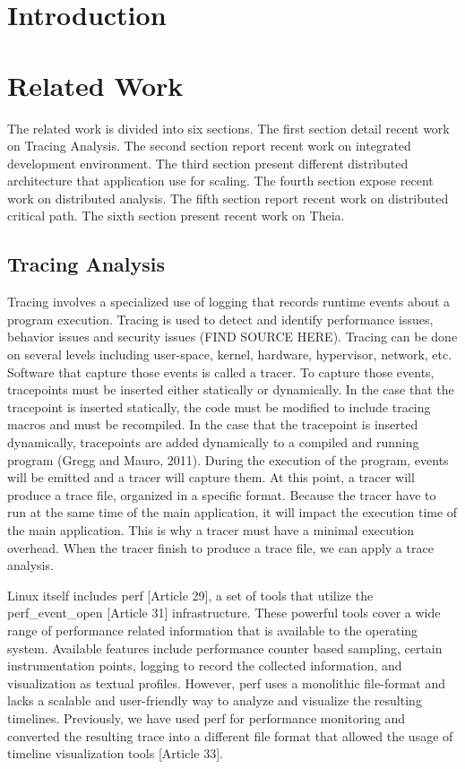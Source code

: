 \label{sec:architecture}

\section{Introduction}

\section{Related Work}

The related work is divided into six sections. The first section detail recent work on Tracing Analysis. The second section report recent work on integrated development environment. The third section present different distributed architecture that application use for scaling. The fourth section expose recent work on distributed analysis. The fifth section report recent work on distributed critical path. The sixth section present recent work on Theia.

\subsection{Tracing Analysis}

 Tracing involves a specialized use of logging that records runtime events about a program execution. Tracing is used to detect and identify performance issues, behavior issues and security issues (FIND SOURCE HERE). Tracing can be done on several levels including user-space, kernel, hardware, hypervisor, network, etc. Software that capture those events is called a tracer. To capture those events, tracepoints must be inserted either statically or dynamically. In the case that the tracepoint is inserted statically, the code must be modified to include tracing macros and must be recompiled. In the case that the tracepoint is inserted dynamically, tracepoints are added dynamically to a compiled and running program (Gregg and Mauro, 2011). During the execution of the program, events will be emitted and a tracer will capture them. At this point, a tracer will produce a trace file, organized in a specific format. Because the tracer have to run at the same time of the main application, it will impact the execution time of the main application. This is why a tracer must have a minimal execution overhead. When the tracer finish to produce a trace file, we can apply a trace analysis. 

Linux itself includes perf [Article 29], a set of tools that utilize the perf\_event\_open [Article 31] infrastructure. These powerful tools cover a wide range of performance related information that is available to the operating system. Available features include performance counter based sampling, certain instrumentation points, logging to record the collected information, and visualization as textual profiles. However, perf uses a monolithic file-format and lacks a scalable and user-friendly way to analyze and visualize the resulting timelines. Previously, we have used perf for performance monitoring and converted the resulting trace into a different file format that allowed the usage of timeline visualization tools [Article 33]. 

